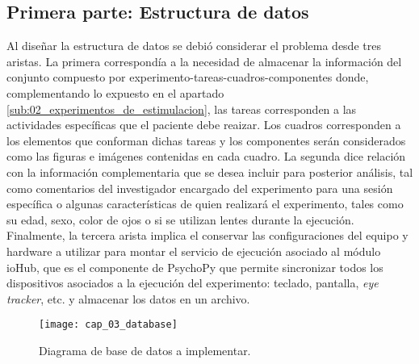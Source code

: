 \documentclass[\main/main.tex]{subfiles}
\begin{document}
		\subsection{Primera parte: Estructura de datos}
		\label{sub:03_estructura_datos}
			Al diseñar la estructura de datos se debió considerar el problema desde tres aristas. La primera correspondía a la necesidad de almacenar la información del conjunto compuesto por experimento-tareas-cuadros-componentes donde, complementando lo expuesto en el apartado \ref{sub:02_experimentos_de_estimulacion}, las tareas corresponden a las actividades específicas que el paciente debe reaizar. Los cuadros corresponden a los elementos que conforman dichas tareas y los componentes serán considerados como las figuras e imágenes contenidas en cada cuadro. La segunda dice relación con la información complementaria que se desea incluir para posterior análisis, tal como comentarios del investigador encargado del experimento para una sesión específica o algunas características de quien realizará el experimento, tales como su edad, sexo, color de ojos o si se utilizan lentes durante la ejecución. Finalmente, la tercera arista implica el conservar las configuraciones del equipo y hardware a utilizar para montar el servicio de ejecución asociado al módulo ioHub, que es el componente de PsychoPy que permite sincronizar todos los dispositivos asociados a la ejecución del experimento: teclado, pantalla, \textit{eye tracker}, etc. y almacenar los datos en un archivo. 
			\begin{figure}[H]
				\centering
				\texttt{[image: cap\_03\_database]}
				\caption{Diagrama de base de datos a implementar.}
				\label{fig:03_database}
			\end{figure} 
\end{document}

